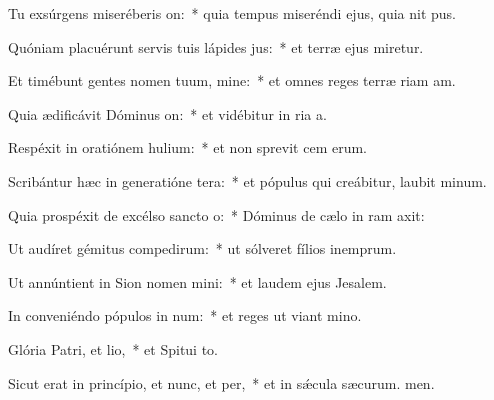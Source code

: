 \item Tu exsúrgens miseréberis on:~* quia tempus miseréndi ejus, quia nit pus.
\item Quóniam placuérunt servis tuis lápides jus:~* et terræ ejus miretur.
\item Et timébunt gentes nomen tuum, mine:~* et omnes reges terræ riam am.
\item Quia ædificávit Dóminus on:~* et vidébitur in ria a.
\item Respéxit in oratiónem hulium:~* et non sprevit cem erum.
\item Scribántur hæc in generatióne tera:~* et pópulus qui creábitur, laubit minum.
\item Quia prospéxit de excélso sancto o:~* Dóminus de cælo in ram axit:
\item Ut audíret gémitus compedirum:~* ut sólveret fílios inemprum.
\item Ut annúntient in Sion nomen mini:~* et laudem ejus  Jesalem.
\item In conveniéndo pópulos in num:~* et reges ut viant mino.
\item Glória Patri, et lio,~* et Spitui to.
\item Sicut erat in princípio, et nunc, et per,~* et in sǽcula sæcurum. men.
